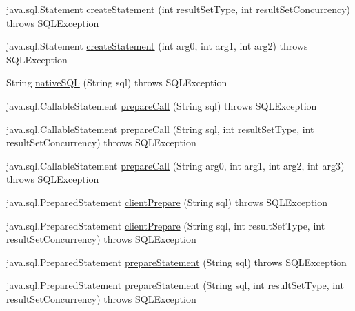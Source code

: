 \begin{DoxyCompactItemize}
\item 
java.\+sql.\+Statement \mbox{\hyperlink{classcom_1_1mysql_1_1cj_1_1jdbc_1_1_connection_wrapper_a3d31ddf344c72fe4d0f8cb8346cbfc71}{create\+Statement}} (int result\+Set\+Type, int result\+Set\+Concurrency)  throws S\+Q\+L\+Exception 
\item 
java.\+sql.\+Statement \mbox{\hyperlink{classcom_1_1mysql_1_1cj_1_1jdbc_1_1_connection_wrapper_a2535bed73382de6da54c5efa8e014089}{create\+Statement}} (int arg0, int arg1, int arg2)  throws S\+Q\+L\+Exception 
\item 
String \mbox{\hyperlink{classcom_1_1mysql_1_1cj_1_1jdbc_1_1_connection_wrapper_aa607c2499080c544ea93a43c2e1e635a}{native\+S\+QL}} (String sql)  throws S\+Q\+L\+Exception 
\item 
java.\+sql.\+Callable\+Statement \mbox{\hyperlink{classcom_1_1mysql_1_1cj_1_1jdbc_1_1_connection_wrapper_ab2c7f6bc0a7b9b072867f639c85c5ea7}{prepare\+Call}} (String sql)  throws S\+Q\+L\+Exception 
\item 
java.\+sql.\+Callable\+Statement \mbox{\hyperlink{classcom_1_1mysql_1_1cj_1_1jdbc_1_1_connection_wrapper_ab4275f28104d43202583c58f600d320e}{prepare\+Call}} (String sql, int result\+Set\+Type, int result\+Set\+Concurrency)  throws S\+Q\+L\+Exception 
\item 
java.\+sql.\+Callable\+Statement \mbox{\hyperlink{classcom_1_1mysql_1_1cj_1_1jdbc_1_1_connection_wrapper_af1c5e71dfedb6faeeff1964a37ea833a}{prepare\+Call}} (String arg0, int arg1, int arg2, int arg3)  throws S\+Q\+L\+Exception 
\item 
java.\+sql.\+Prepared\+Statement \mbox{\hyperlink{classcom_1_1mysql_1_1cj_1_1jdbc_1_1_connection_wrapper_a9d4c3ed2f9808b0941df0be53b2be648}{client\+Prepare}} (String sql)  throws S\+Q\+L\+Exception 
\item 
java.\+sql.\+Prepared\+Statement \mbox{\hyperlink{classcom_1_1mysql_1_1cj_1_1jdbc_1_1_connection_wrapper_a97c0bd9d37c2cf6bfd6c0cf9e30fb101}{client\+Prepare}} (String sql, int result\+Set\+Type, int result\+Set\+Concurrency)  throws S\+Q\+L\+Exception 
\item 
java.\+sql.\+Prepared\+Statement \mbox{\hyperlink{classcom_1_1mysql_1_1cj_1_1jdbc_1_1_connection_wrapper_a8f2985cd44be623704304c96619992ca}{prepare\+Statement}} (String sql)  throws S\+Q\+L\+Exception 
\item 
java.\+sql.\+Prepared\+Statement \mbox{\hyperlink{classcom_1_1mysql_1_1cj_1_1jdbc_1_1_connection_wrapper_a62fc8536796d72dde86b74ff39bb0837}{prepare\+Statement}} (String sql, int result\+Set\+Type, int result\+Set\+Concurrency)  throws S\+Q\+L\+Exception 

\end{DoxyCompactItemize}
